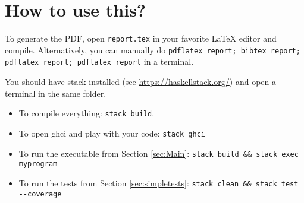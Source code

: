 \section{How to use this?}

To generate the PDF, open \texttt{report.tex} in your favorite LaTeX editor and compile. Alternatively, you can manually do \texttt{pdflatex report; bibtex report; pdflatex report; pdflatex report} in a terminal.

You should have stack installed (see \url{https://haskellstack.org/}) and
open a terminal in the same folder.

\begin{itemize}
  \item To compile everything: \verb|stack build|.
  \item To open ghci and play with your code: \verb|stack ghci|
  \item To run the executable from Section \ref{sec:Main}: \verb|stack build && stack exec myprogram|
  \item To run the tests from Section \ref{sec:simpletests}: \verb|stack clean && stack test --coverage|
\end{itemize}
